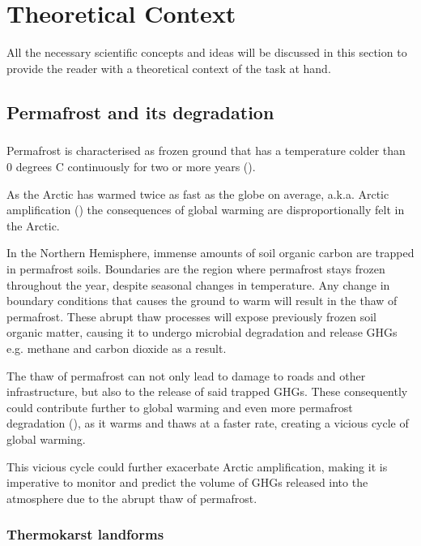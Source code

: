 \chapter{Theoretical Context} \label{lit_review}

All the necessary scientific concepts and ideas will be discussed in this section to provide the reader with a theoretical context of the task at hand.

\section{Permafrost and its degradation}  \label{perma_intro}
\paragraph{}
Permafrost is characterised as frozen ground that has a temperature colder than 0 degrees C continuously for two or more years (\cite{everdingen_multi-language_1998}).

As the Arctic has warmed twice as fast as the globe on average, \gls{a.k.a.} Arctic amplification (\cite{climatechangefur}) the consequences of global warming are disproportionally felt in the Arctic. 

In the Northern Hemisphere, immense amounts of soil organic carbon are trapped in permafrost soils. Boundaries are the region where permafrost stays frozen throughout the year,  despite seasonal changes in temperature. Any change in boundary conditions that causes the ground to warm will result in the thaw of permafrost. These abrupt thaw processes will expose previously frozen soil organic matter, causing it to undergo microbial degradation and release \gls{GHGs} \gls{e.g.} methane and carbon dioxide as a result.

The thaw of permafrost can not only lead to damage to roads and other infrastructure, but also to the release of said trapped \gls{GHGs}. These consequently could contribute further to global warming and even more permafrost degradation (\cite{MURTON2021857}), as it warms and thaws at a faster rate, creating a vicious cycle of global warming.

This vicious cycle could further exacerbate Arctic amplification, making it is imperative to monitor and predict the volume of GHGs released into the atmosphere due to the abrupt thaw of permafrost.

\subsection{Thermokarst landforms}  \label{thermokarst_intro}
